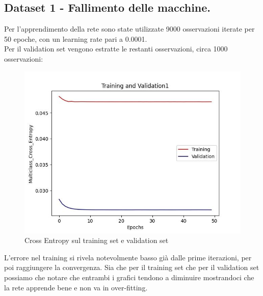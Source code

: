 \documentclass{article}
\begin{document}
        \subsection{Dataset 1 - Fallimento delle macchine.}\label{subsec:dataset-1}
            Per l'apprendimento della rete sono state utilizzate 9000 osservazioni iterate per 50 epoche, con un learning rate pari a 0.0001.\\
            Per il validation set vengono estratte le restanti osservazioni, circa 1000 osservazioni:
            \begin{figure}[H]
                \centering
                \includegraphics[scale=0.50]{lossval1}
                \caption{Cross Entropy sul training set e validation set}
                \label{fig:figure3}
            \end{figure}
            L'errore nel training si rivela notevolmente basso già dalle prime iterazioni, per poi raggiungere la convergenza.
            Sia che per il training set che per il validation set possiamo che notare che entrambi i grafici tendono a diminuire
            mostrandoci che la rete apprende bene e non va in over-fitting.
\end{document}
